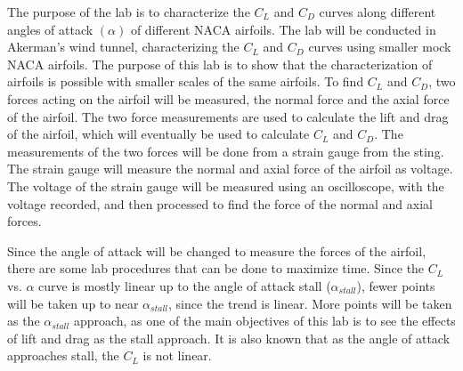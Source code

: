 \documentclass[a4paper,11pt]{texMemo}
\begin{document}
\maketitle

The purpose of the lab is to characterize the $C_L$ and $C_D$ curves along different angles of attack $(\alpha)$ of different NACA airfoils. The lab will be conducted in Akerman's wind tunnel, characterizing the $C_L$ and $C_D$ curves using smaller mock NACA airfoils. The purpose of this lab is to show that the characterization of airfoils is possible with smaller scales of the same airfoils. To find $C_L$ and $C_D$, two forces acting on the airfoil will be measured, the normal force and the axial force of the airfoil. The two force measurements are used to calculate the lift and drag of the airfoil, which will eventually be used to calculate $C_L$ and $C_D$. The measurements of the two forces will be done from a strain gauge from the sting. The strain gauge will measure the normal and axial force of the airfoil as voltage. The voltage of the strain gauge will be measured using an oscilloscope, with the voltage recorded, and then processed to find the force of the normal and axial forces. 

Since the angle of attack will be changed to measure the forces of the airfoil, there are some lab procedures that can be done to maximize time. Since the $C_L$ vs. $\alpha$ curve is mostly linear up to the angle of attack stall ($\alpha_{stall}$), fewer points will be taken up to near $\alpha_{stall}$, since the trend is linear. More points will be taken as the $\alpha_{stall}$ approach, as one of the main objectives of this lab is to see the effects of lift and drag as the stall approach. It is also known that as the angle of attack approaches stall, the $C_L$ is not linear. 
\end{document}
